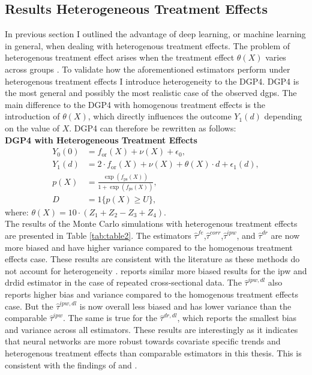 \subsection{Results Heterogeneous Treatment Effects}
In previous section I outlined the advantage of deep learning, or machine learning in general, when dealing with heterogenous treatment effects.
The problem of heterogenous treatment effect arises when the treatment effect $\theta(X)$ varies across groups \citep{hansen2022econometrics}.
To validate how the aforementioned estimators perform under heterogenous treatment effects I introduce heterogeneity to the DGP4.
DGP4 is the most general and possibly the most realistic case of the observed \ac{dgp}s.
The main difference to the DGP4 with homogenous treatment effects is the introduction of $\theta(X)$, which directly influences the outcome $Y_1(d)$ depending on the value of $X$.
DGP4 can therefore be rewritten as follows:
\\
\textbf{DGP4 with Heterogeneous Treatment Effects}
\begin{align*}
    Y_0(0) &= f_{\text{or}}(X) + \nu(X) + \epsilon_0, \\
    Y_1(d) &= 2 \cdot f_{\text{or}}(X) + \nu(X) + \theta(X) \cdot d + \epsilon_1(d), \\
    p(X) &= \frac{\exp \left( f_{\text{ps}}(X) \right)}{1 + \exp \left( f_{\text{ps}}(X) \right)}, \\
    D &= 1\{ p(X) \geq U \},
\end{align*}
where: $\theta(X) = 10 \cdot (Z_1 + Z_2 - Z_3 + Z_4)$.\\

The results of the Monte Carlo simulations with heterogenous treatment effects are presented in Table \ref{tab:table2}.
The estimators $\hat{\tau}^{fe}$,$\hat{\tau}^{corr}$,$\hat{\tau}^{ipw}$, and $\hat{\tau}^{dr}$ are now more biased and have higher variance compared to the homogenous treatment effects case.
These results are consistent with the literature as these methods do not account for heterogeneity \citep{hansen2022econometrics}.
\citet{manfeDifferenceInDifferenceDesignRepeated} reports similar more biased results for the \ac{ipw} and \ac{drdid} estimator in the case of repeated cross-sectional data.
The $\hat{\tau}^{ipw,dl}$ also reports higher bias and variance compared to the homogenous treatment effects case.
But the $\hat{\tau}^{ipw,dl}$ is now overall less biased and has lower variance than the comparable $\hat{\tau}^{ipw}$.
The same is true for the $\hat{\tau}^{dr,dl}$, which reports the smallest bias and variance across all estimators.
These results are interestingly as it indicates that neural networks are more robust towards covariate specific trends and heterogenous treatment effects than comparable estimators in this thesis.
This is consistent with the findings of \citet{farrellDeepNeuralNetworks2021} and \citet{chernozhukovDoubleDebiasedMachine2018}.

